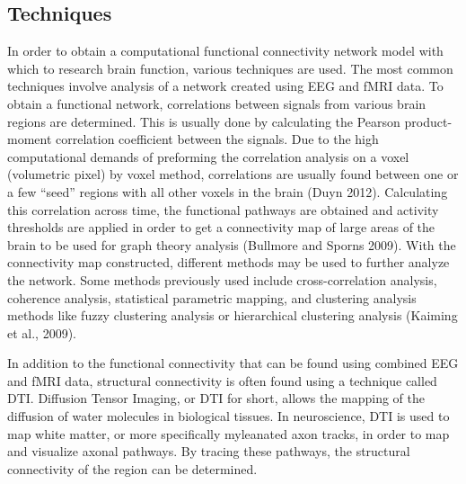 \documentclass[11pt,letterpaper,doublespacing,titlepage]{article}
\begin{document}
\subsection{Techniques}
\par
In order to obtain a computational functional connectivity network model with which to research brain function, various techniques are used.  The most common techniques involve analysis of a network created using EEG and fMRI data. To obtain a functional network, correlations between signals from various brain regions are determined. This is usually done by calculating the Pearson product-moment correlation coefficient between the signals. Due to the high computational demands of preforming the correlation analysis on a voxel (volumetric pixel) by voxel method, correlations are usually found between one or a few “seed” regions with all other voxels in the brain (Duyn 2012). Calculating this correlation across time, the functional pathways are obtained and activity thresholds are applied in order to get a connectivity map of large areas of the brain to be used for graph theory analysis (Bullmore and Sporns 2009).  With the connectivity map constructed, different methods may be used to further analyze the network. Some methods previously used include cross-correlation analysis, coherence analysis, statistical parametric mapping, and clustering analysis methods like fuzzy clustering analysis or hierarchical clustering analysis (Kaiming et al., 2009).
\par
In addition to the functional connectivity that can be found using combined EEG and fMRI data, structural connectivity is often found using a technique called DTI. Diffusion Tensor Imaging, or DTI for short, allows the mapping of the diffusion of water molecules in biological tissues. In neuroscience, DTI is used to map white matter, or more specifically myleanated axon tracks, in order to map and visualize axonal pathways. By tracing these pathways, the structural connectivity of the region can be determined.
\end{document}
